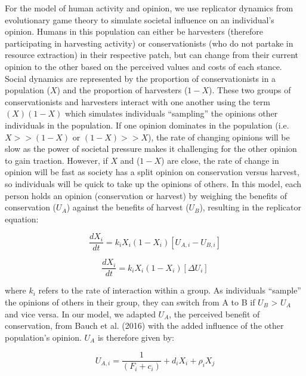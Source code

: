 \documentclass[
  12pt,
]{article}
\begin{document}
For the model of human activity and opinion, we use replicator dynamics from evolutionary game theory to simulate societal influence on an individual's opinion. Humans in this population can either be harvesters (therefore participating in harvesting activity) or conservationists (who do not partake in resource extraction) in their respective patch, but can change from their current opinion to the other based on the perceived values and costs of each stance. Social dynamics are represented by the proportion of conservationists in a population (\(X\)) and the proportion of harvesters (\(1-X\)). These two groups of conservationists and harvesters interact with one another using the term \((X)(1-X)\) which simulates individuals ``sampling'' the opinions other individuals in the population. If one opinion dominates in the population (i.e.~\(X >> (1-X)\) or \((1-X) >> X\)), the rate of changing opinions will be slow as the power of societal pressure makes it challenging for the other opinion to gain traction. However, if \(X\) and (\(1-X\)) are close, the rate of change in opinion will be fast as society has a split opinion on conservation versus harvest, so individuals will be quick to take up the opinions of others. In this model, each person holds an opinion (conservation or harvest) by weighing the benefits of conservation (\(U_A\)) against the benefits of harvest (\(U_B\)), resulting in the replicator equation:

\begin{equation} 
\frac{dX_i}{dt} = k_iX_i(1-X_i)[U_{A,i} - U_{B,i}]
  \label{eq:rep1}
\end{equation}

\begin{equation} 
\frac{dX_i}{dt} = k_iX_i(1-X_i)[\Delta U_i]
  \label{eq:rep2}
\end{equation}

where \(k_i\) refers to the rate of interaction within a group. As individuals ``sample'' the opinions of others in their group, they can switch from A to B if \(U_B\) \textgreater{} \(U_A\) and vice versa. In our model, we adapted \(U_A\), the perceived benefit of conservation, from Bauch et al. (2016) with the added influence of the other population's opinion. \(U_A\) is therefore given by:

\begin{equation} 
U_{A,i} = \frac{1}{(F_i + c_i)} + d_iX_i + \rho_i X_j
  \label{eq:pros1}
\end{equation}
\end{document}
